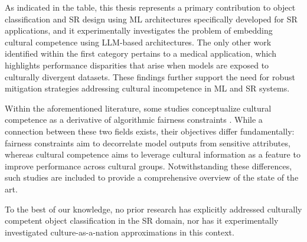 As indicated in the table, this thesis represents a primary contribution to object classification and SR design using ML architectures specifically developed for SR applications, and it experimentally investigates the problem of embedding cultural competence using LLM-based architectures. The only other work identified within the first category pertains to a medical application, which highlights performance disparities that arise when models are exposed to culturally divergent datasets. These findings further support the need for robust mitigation strategies addressing cultural incompetence in ML and SR systems.

Within the aforementioned literature, some studies conceptualize cultural competence as a derivative of algorithmic fairness constraints \citep{karpouzis2024plato, albuquerque2024hype}. While a connection between these two fields exists, their objectives differ fundamentally: fairness constraints aim to decorrelate model outputs from sensitive attributes, whereas cultural competence aims to leverage cultural information as a feature to improve performance across cultural groups. Notwithstanding these differences, such studies are included to provide a comprehensive overview of the state of the art.

To the best of our knowledge, no prior research has explicitly addressed culturally competent object classification in the SR domain, nor has it experimentally investigated culture-as-a-nation approximations in this context.

